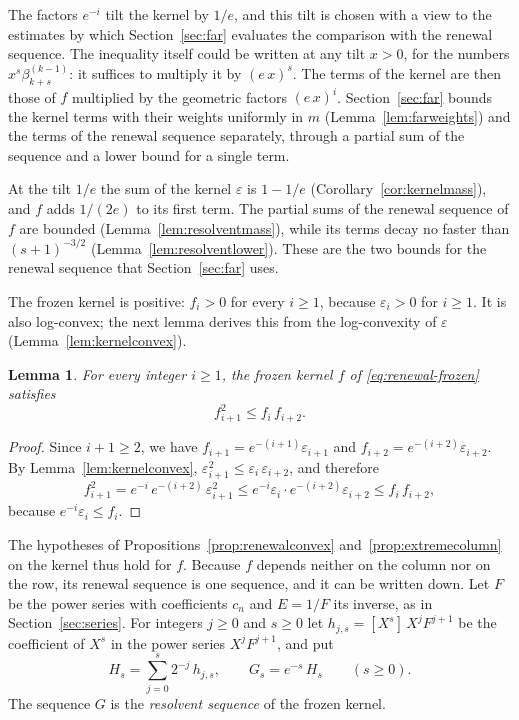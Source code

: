 \documentclass{amsart}
\newtheorem{lemma}[theorem]{Lemma}
\theoremstyle{definition}
\theoremstyle{remark}
\numberwithin{equation}{section}
\begin{document}
The factors $e^{-i}$ tilt the kernel by $1/e$, and this tilt is chosen with
a view to the estimates by which Section~\ref{sec:far} evaluates the
comparison with the renewal sequence. The inequality itself could be written
at any tilt $x>0$, for the numbers $x^s\beta^{(k-1)}_{k+s}$: it suffices to
multiply it by $(e\,x)^s$. The terms of the kernel are then those of $f$
multiplied by the geometric factors $(e\,x)^i$. Section~\ref{sec:far} bounds
the kernel terms with their weights uniformly in $m$
(Lemma~\ref{lem:farweights}) and the terms of the renewal sequence
separately, through a partial sum of the sequence and a lower bound for a
single term.

At the tilt $1/e$ the sum of the kernel $\varepsilon$ is $1-1/e$
(Corollary~\ref{cor:kernelmass}), and $f$ adds $1/(2e)$ to its first term.
The partial sums of the renewal sequence of $f$ are bounded
(Lemma~\ref{lem:resolventmass}), while its terms decay no faster than
$(s+1)^{-3/2}$ (Lemma~\ref{lem:resolventlower}). These are the two bounds
for the renewal sequence that Section~\ref{sec:far} uses.

The frozen kernel is positive: $f_i>0$ for every $i\ge1$, because
$\varepsilon_i>0$ for $i\ge1$. It is also log-convex; the next lemma derives
this from the log-convexity of $\varepsilon$
(Lemma~\ref{lem:kernelconvex}).

\begin{lemma}\label{lem:frozenconvex}
For every integer $i\ge1$, the frozen kernel $f$ of
\eqref{eq:renewal-frozen} satisfies
\[
f_{i+1}^2\le f_i\,f_{i+2} .
\]
\end{lemma}

\begin{proof}
Since $i+1\ge2$, we have $f_{i+1}=e^{-(i+1)}\varepsilon_{i+1}$ and
$f_{i+2}=e^{-(i+2)}\varepsilon_{i+2}$. By Lemma~\ref{lem:kernelconvex},
$\varepsilon_{i+1}^2\le\varepsilon_i\,\varepsilon_{i+2}$, and therefore
\[
f_{i+1}^2=e^{-i}\,e^{-(i+2)}\,\varepsilon_{i+1}^2
\le e^{-i}\varepsilon_i\cdot e^{-(i+2)}\varepsilon_{i+2}
\le f_i\,f_{i+2} ,
\]
because $e^{-i}\varepsilon_i\le f_i$.
\end{proof}

The hypotheses of Propositions~\ref{prop:renewalconvex}
and~\ref{prop:extremecolumn} on the kernel thus hold for $f$. Because $f$
depends neither on the column nor on the row, its renewal sequence is one
sequence, and it can be written down. Let $F$ be the power series with
coefficients $c_n$ and $E=1/F$ its inverse, as in Section~\ref{sec:series}.
For integers $j\ge0$ and $s\ge0$ let $h_{j,s}=[X^s]\,X^jF^{j+1}$ be the
coefficient of $X^s$ in the power series $X^jF^{j+1}$, and put
\begin{equation}\label{eq:renewal-resolvent}
H_s=\sum_{j=0}^{s}2^{-j}\,h_{j,s},\qquad G_s=e^{-s}\,H_s
\qquad(s\ge0).
\end{equation}
The sequence $G$ is the \emph{resolvent sequence} of the frozen kernel.
\end{document}
